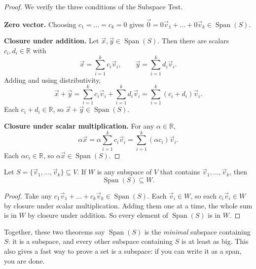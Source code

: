 \begin{proof}
We verify the three conditions of the Subspace Test.

\textbf{Zero vector.} Choosing $c_1 = \dots = c_k = 0$ gives $\vec{0} = 0\vec{v}_1 + \dots + 0\vec{v}_k \in \operatorname{Span}(S)$.

\textbf{Closure under addition.} Let $\vec{x}, \vec{y} \in \operatorname{Span}(S)$. Then there are scalars $c_i, d_i \in \mathbb{R}$ with
\[
\vec{x} = \sum_{i=1}^k c_i\vec{v}_i, \qquad \vec{y} = \sum_{i=1}^k d_i\vec{v}_i.
\]
Adding and using distributivity,
\[
\vec{x} + \vec{y} = \sum_{i=1}^k c_i\vec{v}_i + \sum_{i=1}^k d_i\vec{v}_i = \sum_{i=1}^k (c_i + d_i)\vec{v}_i.
\]
Each $c_i + d_i \in \mathbb{R}$, so $\vec{x} + \vec{y} \in \operatorname{Span}(S)$.

\textbf{Closure under scalar multiplication.} For any $\alpha \in \mathbb{R}$,
\[
\alpha \vec{x} = \alpha \sum_{i=1}^k c_i\vec{v}_i = \sum_{i=1}^k (\alpha c_i)\vec{v}_i.
\]
Each $\alpha c_i \in \mathbb{R}$, so $\alpha \vec{x} \in \operatorname{Span}(S)$.
\end{proof}

\begin{theorem}
Let $S = \{\vec{v}_1, \dots, \vec{v}_k\} \subseteq V$. If $W$ is any subspace of $V$ that contains $\vec{v}_1, \dots, \vec{v}_k$, then
\[
\operatorname{Span}(S) \subseteq W.
\]
\end{theorem}

\begin{proof}
Take any $c_1\vec{v}_1 + \dots + c_k\vec{v}_k \in \operatorname{Span}(S)$. Each $\vec{v}_i \in W$, so each $c_i\vec{v}_i \in W$ by closure under scalar multiplication. Adding them one at a time, the whole sum is in $W$ by closure under addition. So every element of $\operatorname{Span}(S)$ is in $W$.
\end{proof}

\begin{remark}
Together, these two theorems say $\operatorname{Span}(S)$ is the \emph{minimal} subspace containing $S$: it is a subspace, and every other subspace containing $S$ is at least as big. This also gives a fast way to prove a set is a subspace: if you can write it as a span, you are done.
\end{remark}

